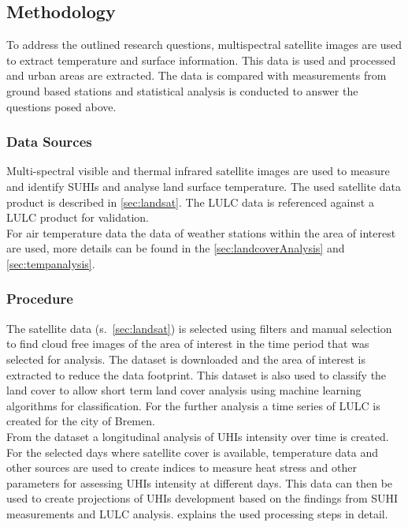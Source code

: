 \documentclass[12pt,a4paper, english,twoside]{scrartcl}
\begin{document}
 \subsection{Methodology}\label{sec:methodology}
  To address the outlined research questions, multispectral satellite images are used to extract temperature and surface information. 
  This data is used and processed and urban areas are extracted. 
  The data is compared with measurements from ground based stations and statistical analysis is conducted to answer the questions posed above.

  \subsubsection{Data Sources}\label{ssec:datasources} 
    Multi-spectral visible and thermal infrared satellite images are used to measure and identify \glspl{SUHI} and analyse land surface temperature.
    The used satellite data product is described in \cref{sec:landsat}.
    The \gls{LULC} data is referenced against a \gls{LULC} product for validation.\\ 
    For air temperature data the data of weather stations within the area of interest are used, more details can be found in the \cref{sec:landcoverAnalysis} and \cref{sec:tempanalysis}. 

  \subsubsection{Procedure}\label{ssec:procedure} 
    The satellite data (s.~\cref{sec:landsat}) is selected using filters and manual selection to find cloud free images of the area of interest in the time period that was selected for analysis. 
    The dataset is downloaded and the area of interest is extracted to reduce the data footprint.
    This dataset is also used to classify the land cover to allow short term land cover analysis using machine learning algorithms for classification.
    For the further analysis a time series of \gls{LULC} is created for the city of Bremen. \\ 
    From the dataset a longitudinal analysis of \glspl{UHI} intensity over time is created.
    For the selected days where satellite cover is available, temperature data and other sources are used to create indices to measure heat stress and other parameters for assessing \glspl{UHI} intensity at different days.
    This data can then be used to create projections of \glspl{UHI} development based on the findings from \gls{SUHI} measurements and \gls{LULC} analysis.
     explains the used processing steps in detail. 
\end{document}
